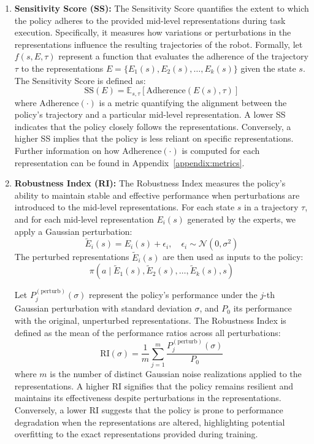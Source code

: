 \documentclass[conference,dvipsnames]{IEEEtran}
\begin{document}
\begin{enumerate}
    \item \textbf{Sensitivity Score (SS):}  
    The Sensitivity Score quantifies the extent to which the policy adheres to the provided mid-level representations during task execution. Specifically, it measures how variations or perturbations in the representations influence the resulting trajectories of the robot. Formally, let $f(s, E, \tau)$ represent a function that evaluates the adherence of the trajectory \( \tau \) to the representations $ E = \{E_{1}(s), E_{2}(s), \ldots, E_{k}(s)\} $ given the state $s$. The Sensitivity Score is defined as:
    $$\text{SS}(E) = \mathbb{E}_{s, \tau} \left[ \text{Adherence}(E(s), \tau) \right]$$
    where $\text{Adherence}(\cdot)$ is a metric quantifying the alignment between the policy's trajectory and a particular mid-level representation. A lower SS indicates that the policy closely follows the representations. Conversely, a higher SS implies that the policy is less reliant on specific representations. Further information on how $\text{Adherence}(\cdot)$ is computed for each representation can be found in Appendix~\ref{appendix:metrics}.
   
\item \textbf{Robustness Index (RI):}  
The Robustness Index measures the policy's ability to maintain stable and effective performance when perturbations are introduced to the mid-level representations. For each state \( s \) in a trajectory \( \tau \), and for each mid-level representation \( E_i(s) \) generated by the experts, we apply a Gaussian perturbation:
\[
\tilde{E}_i(s) = E_i(s) + \epsilon_i, \quad \epsilon_i \sim \mathcal{N}(0, \sigma^2)
\]
The perturbed representations \( \tilde{E}_i(s) \) are then used as inputs to the policy:
\[
\pi(a \mid \tilde{E}_1(s), \tilde{E}_2(s), \ldots, \tilde{E}_k(s), s)
\]

Let \( P_j^{(\text{perturb})}(\sigma) \) represent the policy's performance under the \( j \)-th Gaussian perturbation with standard deviation \( \sigma \), and \( P_0 \) its performance with the original, unperturbed representations. The Robustness Index is defined as the mean of the performance ratios across all perturbations:
\[
\text{RI}(\sigma) = \frac{1}{m} \sum_{j=1}^{m} \frac{P_j^{(\text{perturb})}(\sigma)}{P_0}
\]
where \( m \) is the number of distinct Gaussian noise realizations applied to the representations. A higher RI signifies that the policy remains resilient and maintains its effectiveness despite perturbations in the representations. Conversely, a lower RI suggests that the policy is prone to performance degradation when the representations are altered, highlighting potential overfitting to the exact representations provided during training.

\end{enumerate}
\end{document}
